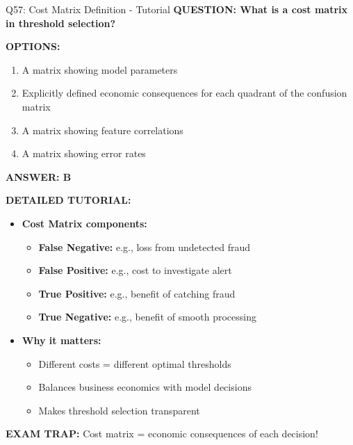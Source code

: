 \documentclass[8pt]{beamer}
\begin{document}
	\begin{frame}{Q57: Cost Matrix Definition - Tutorial}
		\fontsize{6.5}{7.5}\selectfont
		\textbf{QUESTION: What is a cost matrix in threshold selection?}
		
		\vspace{0.1cm}
		\textbf{OPTIONS:}
		\begin{enumerate}
			\item A matrix showing model parameters
			\item Explicitly defined economic consequences for each quadrant of the confusion matrix
			\item A matrix showing feature correlations
			\item A matrix showing error rates
		\end{enumerate}
		
		\vspace{0.1cm}
		\textcolor{myblue}{\textbf{ANSWER: B}}
		
		\vspace{0.1cm}
		\textbf{DETAILED TUTORIAL:}
		\begin{itemize}
			\item \textbf{Cost Matrix components:}
			\begin{itemize}
				\item \textbf{False Negative:} e.g., loss from undetected fraud
				\item \textbf{False Positive:} e.g., cost to investigate alert
				\item \textbf{True Positive:} e.g., benefit of catching fraud
				\item \textbf{True Negative:} e.g., benefit of smooth processing
			\end{itemize}
			\item \textbf{Why it matters:}
			\begin{itemize}
				\item Different costs = different optimal thresholds
				\item Balances business economics with model decisions
				\item Makes threshold selection transparent
			\end{itemize}
		\end{itemize}
		
		\textcolor{myred}{\textbf{EXAM TRAP:}} Cost matrix = \textcolor{myblue}{economic consequences} of each decision!
	\end{frame}
	
\end{document}

